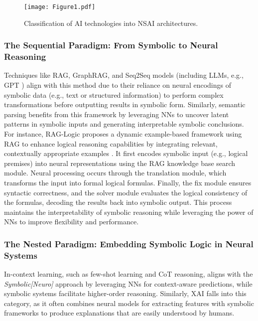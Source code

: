\documentclass[12pt]{article}
\begin{document}
\begin{figure}[!h]
    \centering
    \texttt{[image: Figure1.pdf]}
    \caption{Classification of AI technologies into NSAI architectures.}
    \label{fig:archi}
\end{figure}

\subsubsection{The Sequential Paradigm: From Symbolic to Neural Reasoning}
Techniques like RAG, GraphRAG, and Seq2Seq models (including LLMs, e.g., GPT \cite{openai2024gpt4technicalreport}) align with this method due to their reliance on neural encodings of symbolic data (e.g., text or structured information) to perform complex transformations before outputting results in symbolic form. Similarly, semantic parsing benefits from this framework by leveraging NNs to uncover latent patterns in symbolic inputs and generating interpretable symbolic conclusions. For instance, RAG-Logic  proposes a dynamic example-based framework using RAG to enhance logical reasoning capabilities by integrating relevant, contextually appropriate examples \cite{anonymous2024raglogic}. It first encodes symbolic input (e.g., logical premises) into neural representations using the RAG knowledge base search module. Neural processing occurs through the translation module, which transforms the input into formal logical formulas. Finally, the fix module ensures syntactic correctness, and the solver module evaluates the logical consistency of the formulas, decoding the results back into symbolic output. This process maintains the interpretability of symbolic reasoning while leveraging the power of NNs to improve flexibility and performance.


\subsubsection{The Nested Paradigm: Embedding Symbolic Logic in Neural Systems}
In-context learning, such as few-shot learning and CoT reasoning, aligns with the \textit{Symbolic[Neuro]} approach by leveraging NNs for context-aware predictions, while symbolic systems facilitate higher-order reasoning. Similarly, XAI falls into this category, as it often combines neural models for extracting features with symbolic frameworks to produce explanations that are easily understood by humans.
\end{document}
